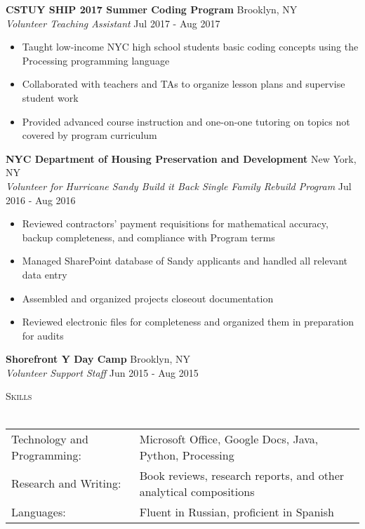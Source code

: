 \documentclass[a4paper]{article}
\newcommand{\lineunder} {
    \vspace*{-8pt} \\
    \hspace*{-18pt} \hrulefill \\
}
\newcommand{\header} [1] {
    {\hspace*{-18pt}\vspace*{6pt} \textsc{#1}}
    \vspace*{-6pt} \lineunder
}
\begin{document}
\textbf{CSTUY SHIP 2017 Summer Coding Program} \hfill Brooklyn, NY\\
\textit{Volunteer Teaching Assistant} \hfill Jul 2017 - Aug 2017\\
\vspace{-1mm}
\begin{itemize} \itemsep 1pt
	\item Taught low-income NYC high school students basic coding concepts using the Processing programming language
	\item Collaborated with teachers and TAs to organize lesson plans and supervise student work
	\item Provided advanced course instruction and one-on-one tutoring on topics not covered by program curriculum
\end{itemize}
\textbf{NYC Department of Housing Preservation and Development} \hfill New York, NY\\
\textit{Volunteer for Hurricane Sandy \textquotedbl{}Build it Back\textquotedbl{} Single Family Rebuild Program} \hfill Jul 2016 - Aug 2016\\
\vspace{-1mm}
\begin{itemize} \itemsep 1pt
	\item Reviewed contractors’ payment requisitions for mathematical accuracy, backup completeness, and compliance with Program terms
	\item Managed SharePoint database of Sandy applicants and handled all relevant data entry
	\item Assembled and organized projects closeout documentation
	\item Reviewed electronic files for completeness and organized them in preparation for audits
\end{itemize}
\textbf{Shorefront Y Day Camp} \hfill Brooklyn, NY\\
\textit{Volunteer Support Staff} \hfill Jun 2015 - Aug 2015\\
\vspace{3mm}
\header{Skills}
\vspace{1mm}
\begin{tabular}{ll}
	Technology and Programming: & Microsoft Office, Google Docs, Java, Python, Processing          \\
	Research and Writing:       & Book reviews, research reports, and other analytical compositions \\
	Languages:                  & Fluent in Russian, proficient in Spanish      
\vspace{3mm}
\end{tabular}
\end{document}
